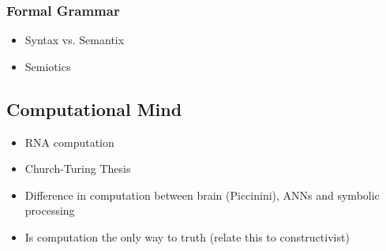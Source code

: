 \subsubsection{Formal Grammar}
\begin{itemize}
    \item Syntax vs. Semantix
    \item Semiotics
\end{itemize}



\subsection{Computational Mind}
\begin{itemize}
    \item RNA computation
    \item Church-Turing Thesis
    \item Difference in computation between brain (Piccinini), ANNs and symbolic processing
    \item Is computation the only way to truth (relate this to constructivist)
\end{itemize}

